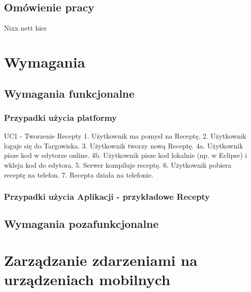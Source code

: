 \documentclass[11pt,a4paper,polish,thesis]{dcsbook}
\begin{document}
\section{Omówienie pracy}
Nixx nett hier

\chapter{Wymagania}
\section{Wymagania funkcjonalne}
\subsection{Przypadki użycia platformy}
UC1 - Tworzenie Recepty
1. Użytkownik ma pomysł na Receptę.
2. Użytkownik loguje się do Targowiska.
3. Użytkownik tworzy nową Receptę.
4a. Użytkownik pisze kod w edytorze online.
4b. Użytkownik pisze kod lokalnie (np. w Eclipse) i wkleja kod do edytora.
5. Serwer kompiluje receptę.
6. Użytkownik pobiera receptę na telefon.
7. Recepta działa na telefonie.
\subsection{Przypadki użycia Aplikacji - przykładowe Recepty}
\section{Wymagania pozafunkcjonalne}

\chapter{Zarządzanie zdarzeniami na urządzeniach mobilnych}
\end{document}

